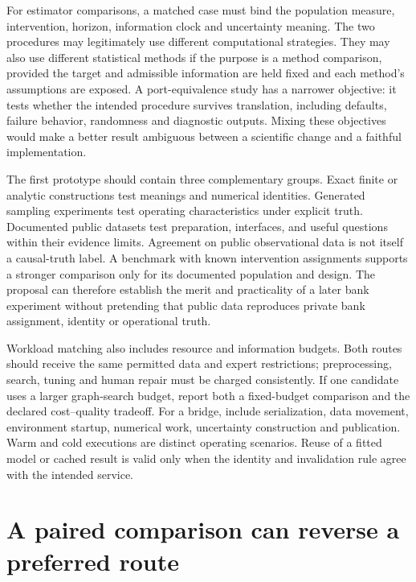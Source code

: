 For estimator comparisons, a matched case must bind the population measure,
intervention, horizon, information clock and uncertainty meaning. The two
procedures may legitimately use different computational strategies. They may
also use different statistical methods if the purpose is a method comparison,
provided the target and admissible information are held fixed and each method's
assumptions are exposed. A port-equivalence study has a narrower objective: it
tests whether the intended procedure survives translation, including defaults,
failure behavior, randomness and diagnostic outputs. Mixing these objectives
would make a better result ambiguous between a scientific change and a faithful
implementation.

The first prototype should contain three complementary groups. Exact finite
or analytic constructions test meanings and numerical identities. Generated
sampling experiments test operating characteristics under explicit truth.
Documented public datasets test preparation, interfaces, and useful questions
within their evidence limits. Agreement on public observational data is not
itself a causal-truth label. A benchmark with known intervention assignments
supports a stronger comparison only for its documented population and design.
The proposal can therefore establish the merit and practicality of a later
bank experiment without pretending that public data reproduces private bank
assignment, identity or operational truth.
\citep{exec16_s10_design}

Workload matching also includes resource and information budgets. Both routes
should receive the same permitted data and expert restrictions; preprocessing,
search, tuning and human repair must be charged consistently. If one candidate
uses a larger graph-search budget, report both a fixed-budget comparison and
the declared cost--quality tradeoff. For a bridge, include serialization, data
movement, environment startup, numerical work, uncertainty construction and
publication. Warm and cold executions are distinct operating scenarios. Reuse
of a fitted model or cached result is valid only when the identity and
invalidation rule agree with the intended service.

\section{A paired comparison can reverse a preferred route}

